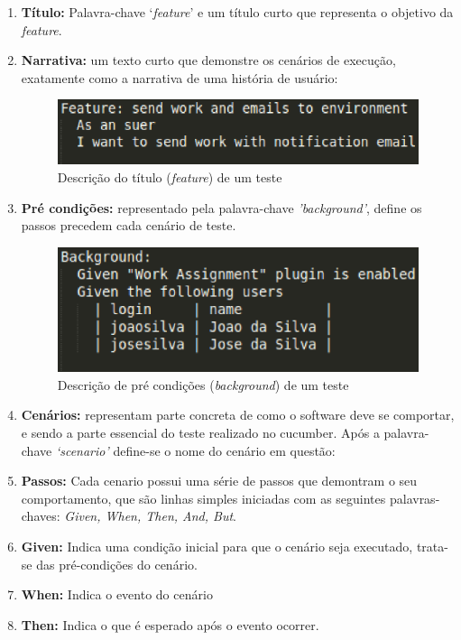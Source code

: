 \begin{enumerate}
\item \textbf{Título:} Palavra-chave ‘\textit{feature}’ e um título curto que representa o 
objetivo da \textit{feature}.
\item \textbf{Narrativa:} um texto curto que demonstre os cenários de execução, 
exatamente como a narrativa de uma história de usuário:

\begin{figure}[!h]
    \centering
    \includegraphics[keepaspectratio=true,scale=0.50]
      {figuras/noosfero_feature2.eps}
    \caption{Descrição do título (\textit{feature}) de um teste}
    \label{nosfero_feature}
\end{figure}

\item \textbf{Pré condições:} representado pela palavra-chave \textit{'background'}, define os passos 
precedem cada cenário de teste.

\begin{figure}[!h]
    \centering
    \includegraphics[keepaspectratio=true,scale=0.50]
      {figuras/noosfero_back.eps}
    \caption{Descrição de pré condições (\textit{background}) de um teste}
    \label{nosfero_feature}
\end{figure}

\item \textbf{Cenários:} representam parte concreta de como o software deve se 
comportar, e sendo a parte essencial do teste realizado no 
cucumber. Após a palavra-chave \textit{‘scenario’} define-se o nome do cenário em questão:
\item \textbf{Passos:} Cada cenario possui uma série de passos que demontram o seu 
comportamento, que são linhas simples iniciadas com as seguintes palavras-chaves: 
\textit{Given, When, Then, And, But}.
\item \textbf{Given:} Indica uma condição inicial para que o cenário seja executado, 
trata-se das pré-condições do cenário.
\item \textbf{When:} Indica o evento do cenário
\item \textbf{Then:} Indica o que é esperado após o evento ocorrer.


\end{enumerate}
